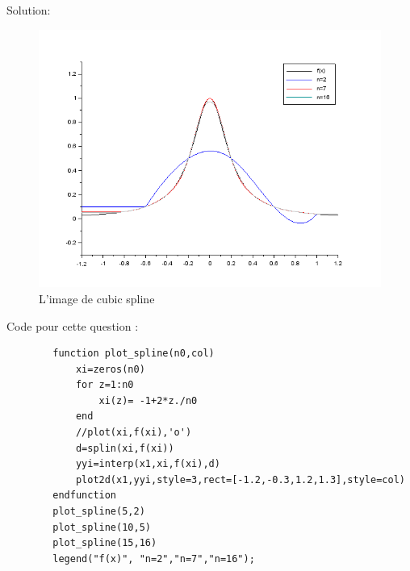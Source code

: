 \documentclass[11pt]{article}
\begin{document}
    Solution:
    \begin{figure}[H]
        \centering
        \includegraphics[scale=0.4]{spli}
        \caption{L'image de cubic spline}
    \end{figure}
    Code pour cette question :
    \begin{verbatim}
        function plot_spline(n0,col)
            xi=zeros(n0)
            for z=1:n0
                xi(z)= -1+2*z./n0
            end
            //plot(xi,f(xi),'o')
            d=splin(xi,f(xi))
            yyi=interp(x1,xi,f(xi),d)
            plot2d(x1,yyi,style=3,rect=[-1.2,-0.3,1.2,1.3],style=col)
        endfunction
        plot_spline(5,2)
        plot_spline(10,5)
        plot_spline(15,16)
        legend("f(x)", "n=2","n=7","n=16");
    \end{verbatim}
\end{document}
